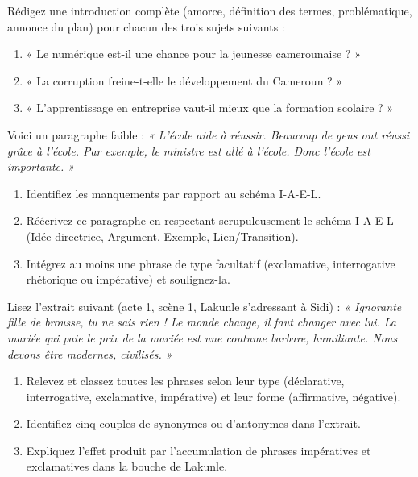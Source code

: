 \documentclass[11pt]{article}
\begin{document}
\begin{exercice}
Rédigez une introduction complète (amorce, définition des termes, problématique, annonce du plan) pour chacun des trois sujets suivants :
\begin{enumerate}
\item « Le numérique est-il une chance pour la jeunesse camerounaise ? »
\item « La corruption freine-t-elle le développement du Cameroun ? »
\item « L'apprentissage en entreprise vaut-il mieux que la formation scolaire ? »
\end{enumerate}
\end{exercice}

\begin{exercice}
Voici un paragraphe faible :
\emph{« L'école aide à réussir. Beaucoup de gens ont réussi grâce à l'école. Par exemple, le ministre est allé à l'école. Donc l'école est importante. »}
\begin{enumerate}
\item Identifiez les manquements par rapport au schéma I-A-E-L.
\item Réécrivez ce paragraphe en respectant scrupuleusement le schéma I-A-E-L (Idée directrice, Argument, Exemple, Lien/Transition).
\item Intégrez au moins une phrase de type facultatif (exclamative, interrogative rhétorique ou impérative) et soulignez-la.
\end{enumerate}
\end{exercice}

\begin{exercice}
Lisez l'extrait suivant (acte 1, scène 1, Lakunle s'adressant à Sidi) :
\emph{« Ignorante fille de brousse, tu ne sais rien ! Le monde change, il faut changer avec lui. La mariée qui paie le prix de la mariée est une coutume barbare, humiliante. Nous devons être modernes, civilisés. »}
\begin{enumerate}
\item Relevez et classez toutes les phrases selon leur type (déclarative, interrogative, exclamative, impérative) et leur forme (affirmative, négative).
\item Identifiez cinq couples de synonymes ou d'antonymes dans l'extrait.
\item Expliquez l'effet produit par l'accumulation de phrases impératives et exclamatives dans la bouche de Lakunle.
\end{enumerate}
\end{exercice}
\end{document}
